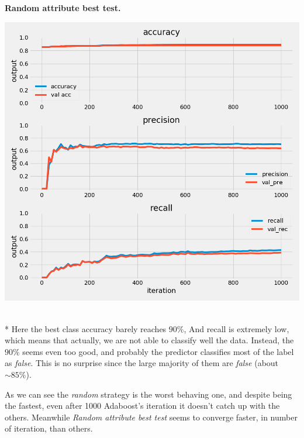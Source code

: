 \documentclass{article}
\begin{document}
\begin{multicols}{2}
	\begin{minipage}[t]{1\columnwidth}
	\begin{center}
	\textbf{Random attribute best test.}\par\medskip
	\includegraphics[width=0.9\columnwidth]{../images/random_selctor_best_test_class_2_cross_val_4.png}
	\label{best}
	\end{center}
	\end{minipage}
	\text{ }
	\\*
	Here the best class accuracy barely reaches $90\%$, And recall is extremely low, which means that
	actually, we are not able to classify well the data. Instead, the $90\%$ seems even too good, and probably
	the predictor classifies most of the label as \textit{false}. This is no surprise since the large majority
	of them are \textit{false} (about $\sim 85 \%$).
	
	As we can see the \textit{random} strategy is the worst behaving one, and despite being the fastest, even after
	1000 Adaboost's iteration it doesn't catch up with the others. Meanwhile \textit{Random attribute best test} seems to
	converge faster, in number of iteration, than others.\\
\end{multicols}
\newpage
\end{document}
